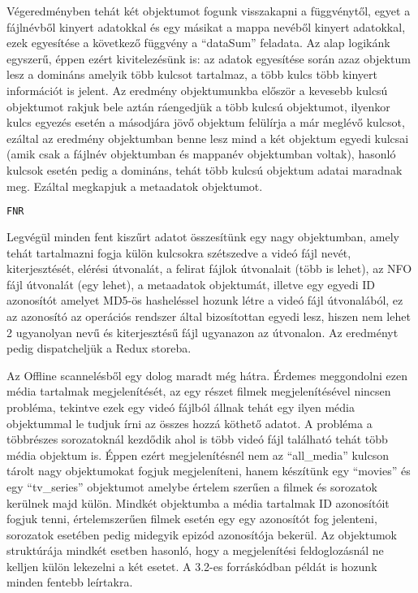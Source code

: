 Végeredményben tehát két objektumot fogunk visszakapni a függvénytől, egyet a fájlnévből kinyert adatokkal és egy másikat a mappa nevéből kinyert adatokkal, ezek egyesítése a következő függvény a ``dataSum'' feladata. Az alap logikánk egyszerű, éppen ezért kivitelezésünk is: az adatok egyesítése során azaz objektum lesz a domináns amelyik több kulcsot tartalmaz, a több kulcs több kinyert információt is jelent. Az eredmény objektumunkba először a kevesebb kulcsú objektumot rakjuk bele aztán ráengedjük a több kulcsú objektumot, ilyenkor kulcs egyezés esetén a másodjára jövő objektum felülírja a már meglévő kulcsot, ezáltal az eredmény objektumban benne lesz mind a két objektum egyedi kulcsai (amik csak a fájlnév objektumban és mappanév objektumban voltak), hasonló kulcsok esetén pedig a domináns, tehát több kulcsú objektum adatai maradnak meg. Ezáltal megkapjuk a metaadatok objektumot.

\begin{lstlisting}[language={python}]
FNR
\end{lstlisting}

Legvégül minden fent kiszűrt adatot összesítünk egy nagy objektumban, amely tehát tartalmazni fogja külön kulcsokra szétszedve a videó fájl nevét, kiterjesztését, elérési útvonalát, a felirat fájlok útvonalait (több is lehet), az NFO fájl útvonalát (egy lehet), a metaadatok objektumát, illetve egy egyedi ID azonosítót amelyet MD5-ös hasheléssel hozunk létre a videó fájl útvonalából, ez az azonosító az operációs rendszer által bizosítottan egyedi lesz, hiszen nem lehet 2 ugyanolyan nevű és kiterjesztésű fájl ugyanazon az útvonalon. Az eredményt pedig dispatcheljük a Redux storeba.

Az Offline scannelésből egy dolog maradt még hátra. Érdemes meggondolni ezen média tartalmak megjelenítését, az egy részet filmek megjelenítésével nincsen probléma, tekintve ezek egy videó fájlból állnak tehát egy ilyen média objektummal le tudjuk írni az összes hozzá köthető adatot. A probléma a többrészes sorozatoknál kezdődik ahol is több videó fájl található tehát több média objektum is. Éppen ezért megjelenítésnél nem az ``all\_media'' kulcson tárolt nagy objektumokat fogjuk megjeleníteni, hanem készítünk egy ``movies'' és egy ``tv\_series'' objektumot amelybe értelem szerűen a filmek és sorozatok kerülnek majd külön. Mindkét objektumba a média tartalmak ID azonosítóit fogjuk tenni, értelemszerűen filmek esetén egy egy azonosítót fog jelenteni, sorozatok esetében pedig midegyik epizód azonosítója bekerül. Az objektumok struktúrája mindkét esetben hasonló, hogy a megjelenítési feldoglozásnál ne kelljen külön lekezelni a két esetet. A 3.2-es forráskódban példát is hozunk minden fentebb leírtakra.

